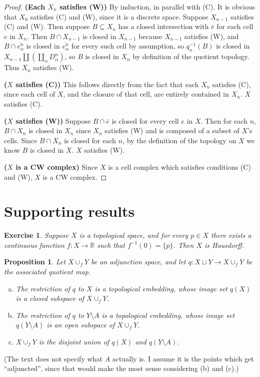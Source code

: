 \documentclass{article}
\newtheorem{exercise}[theorem]{Exercise}
\newtheorem{proposition}[theorem]{Proposition}
\theoremstyle{definition}
\newcommand{\R}{\mathbb{R}}
\begin{document}
\begin{proof}
\textbf{(Each $X_n$ satisfies (W))}
By induction, in parallel with (C).
It is obvious that $X_0$ satisfies (C) and (W), since it is a discrete space. 
Suppose $X_{n-1}$ satisfies (C) and (W). Then suppose $B \subseteq X_n$ has a closed
intersection with $\bar{e}$ for each cell $e$ in $X_n$. Then 
$B \cap X_{n-1}$ is closed in $X_{n-1}$ because $X_{n-1}$ satisfies (W), and 
$B \cap \overline{e_\alpha^n}$ is closed in $\overline{e_\alpha^n}$ for every such
cell by assumption, so $q_n^{-1}(B)$ is closed in 
$X_{n-1} \amalg (\coprod_\alpha D_\alpha^n)$, so $B$ is closed in $X_n$ by definition
of the quotient topology. Thus $X_n$ satisfies (W).

\textbf{($X$ satisfies (C))}
This follows directly from the fact that each $X_n$ satisfies (C), since each
cell of $X$, and the closure of that cell, are entirely contained in $X_n$.
$X$ satisfies (C).

\textbf{($X$ satisfies (W))}
Suppose $B \cap \bar{e}$ is closed for every cell $e$ in $X$. Then for each $n$,
$B \cap X_n$ is closed in $X_n$ since $X_n$ satisfies (W) and is composed of a
subset of $X$'s cells. Since $B \cap X_n$ is closed for each $n$, by the definition
of the topology on $X$ we know $B$ is closed in $X$. $X$ satisfies (W).

\textbf{($X$ is a CW complex)}
Since $X$ is a cell complex which satisfies conditions (C) and (W), $X$ is 
a CW complex.
\end{proof}

\section*{Supporting results}
\renewcommand{\thetheorem}{2.35}
\begin{exercise}
Suppose $X$ is a topological space, and for every $p \in X$ there exists a continuous
function $f : X \to \R$ such that $f^{-1}(0) = \{p\}$. Then $X$ is Hausdorff.
\end{exercise}

\renewcommand{\thetheorem}{3.77}
\begin{proposition}
Let $X \cup_f Y$ be an adjunction space, and let $q : X \sqcup Y \to X \cup_f Y$ be the
associated quotient map.
\begin{enumerate}[(a)]
\item The restriction of $q$ to $X$ is a topological embedding, whose image set $q(X)$ is 
a closed subspace of $X \cup_f Y$.
\item The restriction of $q$ to $Y \setminus A$ is a topological embedding, whose image set
$q(Y \setminus A)$ is an open subspace of $X \cup_f Y$.
\item $X \cup_f Y$ is the disjoint union of $q(X)$ and $q(Y \setminus A)$.
\end{enumerate}
\end{proposition}
(The text does not specify what $A$ actually is. I assume it is the points which get 
``adjuncted'', since that would make the most sense considering (b) and (c).)
\end{document}
